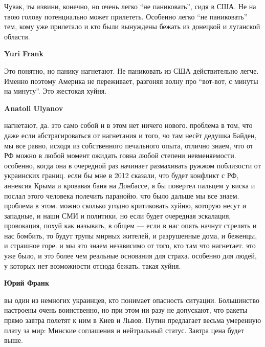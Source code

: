  
 
 
 
 
\zzSecCmt

\begin{itemize} %

Чувак, ты извини, конечно, но очень легко \enquote{не паниковать}, сидя в США. Не на
твою голову потенциально может прилететь. Особенно легко \enquote{не паниковать} тем,
кому уже прилетало и кто были вынуждены бежать из донецкой и луганской области.

\begin{itemize} %
\textbf{Yuri Frank} 

Это понятно, но панику нагнетают. Не паниковать из США действительно легче.
Именно поэтому Америка не переживает, разгоняя волну про \enquote{вот-вот, с минуты на
минуту}. Это жестокая хуйня.

\textbf{Anatoli Ulyanov} 

нагнетают, да. это само собой и в этом нет ничего нового. проблема в том, что
даже если абстрагироваться от нагнетания и того, чо там несёт дедушка Байден,
мы все равно, исходя из собственного печального опыта, отлично знаем, что от РФ
можно в любой момент ожидать говна любой степени невменяемости. особенно, когда
она в очередной раз начинает размахивать ружжом поблизости от украинских
границ. если бы мне в 2012 сказали, что будет конфликт с РФ, аннексия Крыма и
кровавая баня на Донбассе, я бы повертел пальцем у виска и послал этого
человека полечить паранойю. что было дальше мы все знаем. проблема в этом.
можно сколько угодно критиковать хуйню, которую несут и западные, и наши СМИ и
политики, но если будет очередная эскалация, провокация, похуй как называть, в
общем — если в нас опять начнут стрелять и нас бомбить, то будут трупы мирных
жителей, и разрушенные дома, и беженцы, и страшное горе. и мы это знаем
независимо от того, кто там что нагнетает. это уже было, и это более чем
реальные основания для страха. особенно для людей, у которых нет возможности
отсюда бежать. такая хуйня.

\textbf{Юрий Франк} 

вы один из немногих украинцев, кто понимает опасность ситуации. Большинство
настроены очень воинственно, но при этом ни разу не допускают, что ракеты прямо
завтра полетят к ним в Киев и Львов. Путин предлагает весьма умеренную плату за
мир: Минские соглашения и нейтральный статус. Завтра цена будет выше.


\end{itemize}
\end{itemize}
